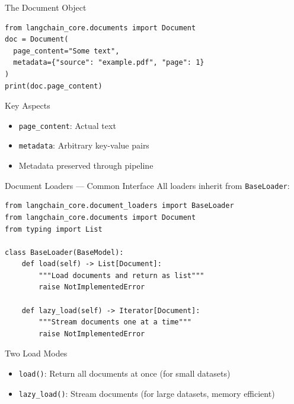 \documentclass[aspectratio=169,11pt]{beamer}
\begin{document}
\begin{frame}[fragile]{The Document Object}
  \small
  \begin{lstlisting}[basicstyle=\ttfamily\tiny]
from langchain_core.documents import Document
doc = Document(
  page_content="Some text",
  metadata={"source": "example.pdf", "page": 1}
)
print(doc.page_content)
  \end{lstlisting}

  \begin{conceptbox}{Key Aspects}
    \begin{itemize}
    \setlength{\itemsep}{1pt}
      \item \texttt{page\_content}: Actual text
      \item \texttt{metadata}: Arbitrary key-value pairs
      \item Metadata preserved through pipeline
    \end{itemize}
  \end{conceptbox}
\end{frame}

\begin{frame}[fragile]{Document Loaders --- Common Interface}
  All loaders inherit from \texttt{BaseLoader}:
  \begin{lstlisting}
from langchain_core.document_loaders import BaseLoader
from langchain_core.documents import Document
from typing import List

class BaseLoader(BaseModel):
    def load(self) -> List[Document]:
        """Load documents and return as list"""
        raise NotImplementedError

    def lazy_load(self) -> Iterator[Document]:
        """Stream documents one at a time"""
        raise NotImplementedError
  \end{lstlisting}

  \vspace{0.5cm}
  \begin{tipbox}{Two Load Modes}
    \begin{itemize}
    \setlength{\itemsep}{1pt}
      \item \texttt{load()}: Return all documents at once (for small datasets)
      \item \texttt{lazy\_load()}: Stream documents (for large datasets, memory efficient)
    \end{itemize}
  \end{tipbox}
\end{frame}
\end{document}
